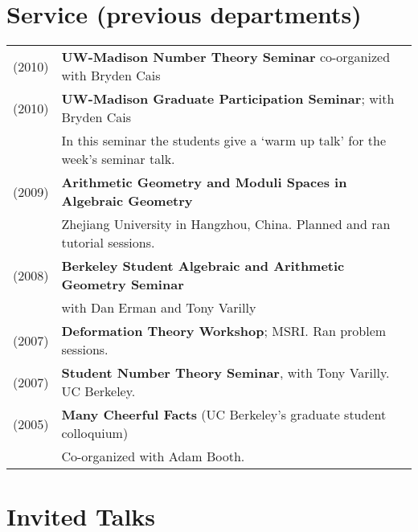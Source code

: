 \documentclass[margin,line]{res}
\begin{document}
\begin{resume}
\section{\sc Service (previous departments)}  
  \begin{tabular}{ll}
    (2010) & \textbf{UW-Madison Number Theory Seminar} co-organized with Bryden Cais\\
    (2010) & \textbf{UW-Madison Graduate Participation Seminar}; with Bryden Cais\\
    & In this seminar the students give a `warm up talk' for the week's seminar talk.\\
    (2009) & \textbf{Arithmetic Geometry and Moduli Spaces in Algebraic Geometry}\\
    & Zhejiang University in Hangzhou, China. Planned and ran tutorial sessions.\\
    (2008) & \textbf{Berkeley Student Algebraic and Arithmetic Geometry Seminar} \\
    & with Dan Erman and Tony Varilly\\
    (2007) & \textbf{Deformation Theory Workshop}; MSRI. Ran problem sessions.\\
    (2007) & \textbf{Student Number Theory Seminar}, with Tony Varilly. UC Berkeley.\\
    (2005) & \textbf{Many Cheerful Facts}  (UC Berkeley's graduate student colloquium)\\
    & Co-organized with Adam Booth. \\
  \end{tabular}

  \section{\sc Invited Talks}


\end{resume}
\end{document}

